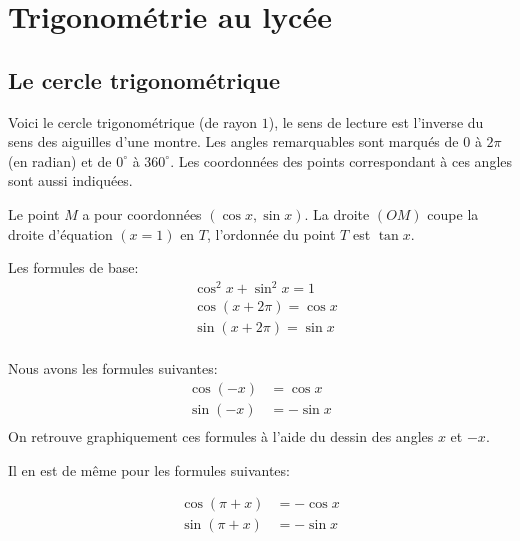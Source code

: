 \documentclass[10pt,class=article,crop=false]{standalone}
\begin{document}
\section{Trigonométrie au lycée}

\begin{multicols}{2}

\subsection{Le cercle trigonométrique}




Voici le cercle trigonométrique (de rayon $1$),
le sens de lecture est l'inverse du sens des aiguilles d'une montre.
Les angles remarquables sont marqués de $0$ à $2 \pi$ (en radian) et de $0^\circ$ à $360^\circ$.
Les coordonnées des points correspondant à ces angles sont aussi indiquées.



Le point $M$ a pour coordonnées $(\cos x,\sin x)$.
La droite $(OM)$ coupe la droite d'équation $(x=1)$ en $T$,
l'ordonnée du point $T$ est $\tan x$.

Les formules de base:
\begin{align*}
	& \cos^2 x + \sin^2 x = 1 \\
	& \cos(x+2\pi)=\cos x \\
	& \sin(x+2\pi)=\sin x \\
\end{align*}

\begin{minipage}{0.45\textwidth}
\end{minipage}
\begin{minipage}{0.42\textwidth}
	Nous avons les formules suivantes:
	\begin{align*}
		\cos (-x) &= \cos x \\
		\sin (-x) &= -\sin x \\
	\end{align*}
	On retrouve graphiquement ces formules à l'aide du dessin des angles $x$ et $-x$.
\end{minipage}

Il en est de même pour les formules suivantes:

\begin{minipage}{0.25\textwidth}
\end{minipage}	
\begin{minipage}{0.15\textwidth}
	\begin{align*}
		\cos (\pi + x) &= -\cos x \\
		\sin (\pi + x) &= -\sin x \\
	\end{align*}
\end{minipage}


\end{multicols}
\end{document}
